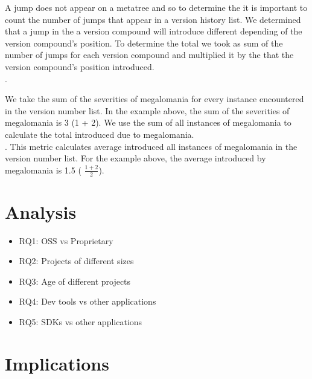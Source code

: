 \documentclass[conference]{IEEEtran}
\begin{document}
 A jump does not appear on a metatree and so to determine the \numberchoices it is important to count the number of jumps that appear in a version history list. 
We determined that a jump in the a version compound will introduce different \numberichoices depending of the version compound's position. 
To determine the total \numberichoices we took as sum of the number of jumps for each version compound and multiplied it by the \numberichoices that the version compound's position introduced. \\


.  

 We take the sum of the severities of megalomania for every instance encountered in  the version number list.
In the example above, the sum of the severities of megalomania is 3 (1 + 2).
We use the sum of all instances of megalomania to calculate the total \numberchoices introduced due to megalomania. \\

 
. 
This metric calculates average \numberchoices introduced all instances of megalomania in the version number list. For the example above, the average \numberchoices introduced by megalomania is 1.5 ( $\frac{ 1 + 2}{2}$).
 \\


\section{Analysis}

\begin{itemize}
\item RQ1: OSS vs Proprietary
\item RQ2: Projects of different sizes
\item RQ3: Age of different projects
\item RQ4: Dev tools vs other applications
\item RQ5: SDKs vs other applications 
\end{itemize}


\section{Implications}
\end{document}
